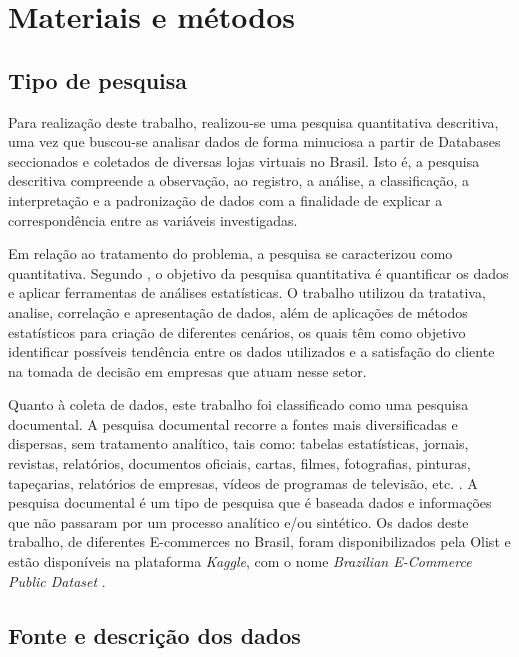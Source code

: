 \section{Materiais e métodos}
\label{sec:materials}

\subsection{Tipo de pesquisa}

Para realização deste trabalho, realizou-se uma pesquisa quantitativa descritiva, uma vez que buscou-se analisar dados de forma minuciosa a partir de Databases seccionados e coletados de diversas lojas virtuais no Brasil. Isto é, a pesquisa descritiva compreende a observação, ao registro, a análise, a classificação, a interpretação e a padronização de dados com a finalidade de explicar a correspondência entre as variáveis investigadas.

Em relação ao tratamento do problema, a pesquisa se caracterizou como quantitativa. Segundo \cite{malhotra2006pesquisa}, o objetivo da pesquisa quantitativa é quantificar os dados e aplicar ferramentas de análises estatísticas. O trabalho utilizou da tratativa, analise, correlação e apresentação de dados, além de aplicações de métodos estatísticos para criação de diferentes cenários, os quais têm como objetivo identificar possíveis tendência entre os dados utilizados e a satisfação do cliente na tomada de decisão em empresas que atuam nesse setor.

Quanto à coleta de dados, este trabalho foi classificado como uma pesquisa documental. A pesquisa documental recorre a fontes mais diversificadas e dispersas, sem tratamento analítico, tais como: tabelas estatísticas, jornais, revistas, relatórios, documentos oficiais, cartas, filmes, fotografias, pinturas, tapeçarias, relatórios de empresas, vídeos de programas de televisão, etc. \citep{fonseca2002}. A pesquisa documental é um tipo de pesquisa que é baseada dados e informações que não passaram por um processo analítico e/ou sintético. Os dados deste trabalho, de diferentes E-commerces no Brasil, foram disponibilizados pela Olist e estão disponíveis na plataforma \textit{Kaggle}, com o nome \textit{Brazilian E-Commerce Public Dataset} \citep{KaggleOlist}.

\subsection{Fonte e descrição dos dados}

